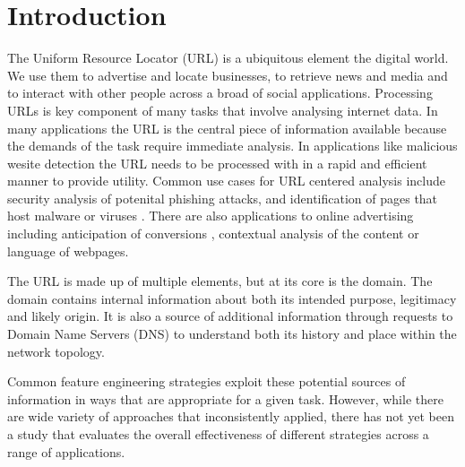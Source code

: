 \documentclass[sigconf]{acmart}
\begin{document}


\maketitle

\section{Introduction}

The Uniform Resource Locator (URL) is a ubiquitous element the digital world. 
We use them to advertise and locate businesses, to retrieve news and media and 
to interact with other people across a broad of social applications.
Processing URLs is key component of many tasks that involve
analysing internet data. In many applications the URL is the central piece of 
information available because the demands of the task require immediate analysis.
In applications like malicious wesite detection the URL needs to be processed with
in a rapid and efficient manner to provide utility\cite{Ma2009b}.
Common use cases for URL centered analysis include security analysis of potenital phishing 
attacks\cite{Basnet2012,Basnet2014,Mamun2016,Vazhayil2018,Tupsamudre2019}, and identification of pages 
that host malware or viruses \cite{Canali2011,Mamun2016}.
There are also applications to online advertising
including anticipation of conversions \cite{Qiu2020}, contextual analysis of
the content\cite{Kan2005,Baykan2009,Meshkizadeh2010} or language\cite{Baykan2013} of webpages. 

The URL is made up of multiple elements, but at its core is the domain. The domain
contains internal information about both its intended purpose, legitimacy and likely
origin. It is also a source of additional information through requests to Domain Name
Servers (DNS) to understand both its history and place within the network topology.

Common feature engineering strategies exploit these potential sources of information
in ways that are appropriate for a given task. However, while there are wide variety
of approaches that inconsistently applied, there has not yet been a study that evaluates
the overall effectiveness of different strategies across a range of applications.
\end{document}

